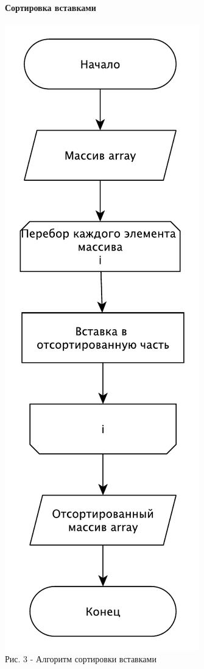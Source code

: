\documentclass[a4paper,14pt]{article} %
\begin{document}
        \hfill
        \paragraph{Сортировка вставками}
        
        \begin{center}
        		\includegraphics[scale = 0.8]{shema2} \\ Рис. 3 - Алгоритм сортировки вставками
	\end{center}
	
\end{document}
